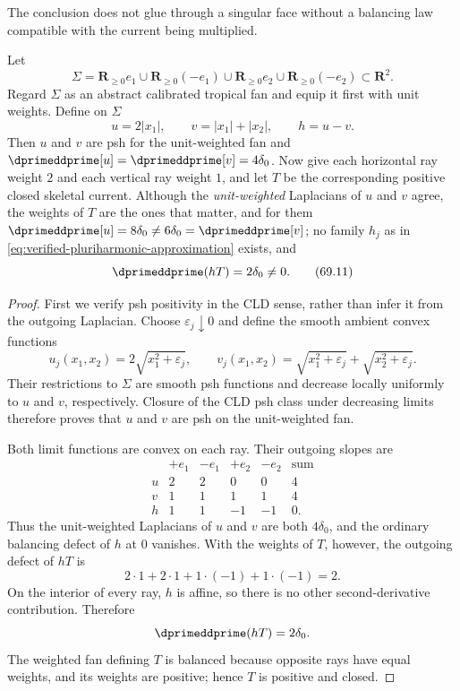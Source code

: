 The conclusion does not glue through a singular face without a
balancing law compatible with the current being multiplied.

\begin{proposition}\label{prop:verified-cross-fan}
Let
\[
 \Sigma
 =\mathbf R_{\geq0}e_1
   \cup\mathbf R_{\geq0}(-e_1)
   \cup\mathbf R_{\geq0}e_2
   \cup\mathbf R_{\geq0}(-e_2)
       \subset\mathbf R^2.
\tag{69.9}\label{eq:verified-cross-fan}
\]
Regard $\Sigma$ as an abstract calibrated tropical fan and equip it first
with unit weights. Define on $\Sigma$
\[
                  u=2|x_1|,
       \qquad
                  v=|x_1|+|x_2|,
       \qquad
                  h=u-v.
\tag{69.10}\label{eq:verified-cross-functions}
\]
Then $u$ and $v$ are psh for the unit-weighted fan and
$\dprimeddprime[u]=\dprimeddprime[v]=4\delta_0$. Now give each horizontal ray weight
$2$ and each vertical ray weight $1$, and let $T$ be the
corresponding positive closed skeletal current.  Although the
\emph{unit-weighted} Laplacians of $u$ and $v$ agree, the weights of
$T$ are the ones that matter, and for them
$\dprimeddprime[u]=8\delta_0\neq6\delta_0=\dprimeddprime[v]$; no family
$h_j$ as in \eqref{eq:verified-pluriharmonic-approximation} exists, and
\[
                         \dprimeddprime(hT)=2\delta_0\neq0.
\tag{69.11}\label{eq:verified-cross-defect}
\]
\end{proposition}

\begin{proof}
First we verify psh positivity in the CLD sense, rather than infer it from
the outgoing Laplacian. Choose $\varepsilon_j\downarrow0$ and define the
smooth ambient convex functions
\[
 u_j(x_1,x_2)=2\sqrt{x_1^2+\varepsilon_j},
 \qquad
 v_j(x_1,x_2)=\sqrt{x_1^2+\varepsilon_j}
              +\sqrt{x_2^2+\varepsilon_j}.
\]
Their restrictions to $\Sigma$ are smooth psh functions and decrease
locally uniformly to $u$ and $v$, respectively. Closure of the CLD psh
class under decreasing limits therefore proves that $u$ and $v$ are
psh on the unit-weighted fan.

Both limit functions are convex on each ray. Their outgoing slopes are
\[
\begin{array}{c|cccc|c}
 &+e_1&-e_1&+e_2&-e_2&\text{sum}\\ \hline
u&2&2&0&0&4\\
v&1&1&1&1&4\\
h&1&1&-1&-1&0.
\end{array}
\tag{69.12}\label{eq:verified-cross-slopes}
\]
Thus the unit-weighted Laplacians of $u$ and $v$ are both
$4\delta_0$, and the ordinary balancing defect of $h$ at $0$
vanishes.
With the weights of $T$, however, the outgoing defect of $hT$ is
\[
             2\cdot1+2\cdot1+1\cdot(-1)+1\cdot(-1)=2.
\tag{69.13}\label{eq:verified-cross-weighted-sum}
\]
On the interior of every ray, $h$ is affine, so there is no other
second-derivative contribution. Therefore
\[
                         \dprimeddprime(hT)=2\delta_0.
\]
The weighted fan defining $T$ is balanced because opposite rays have equal
weights, and its weights are positive; hence $T$ is positive and closed.
\end{proof}

